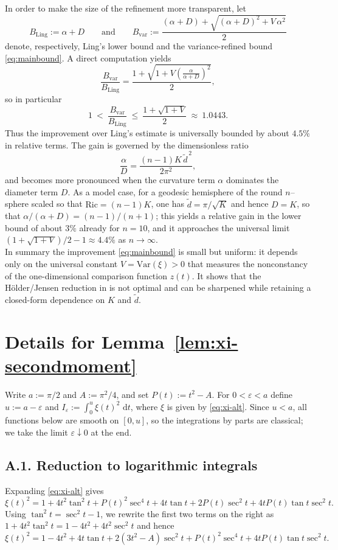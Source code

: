 \documentclass[11pt]{article}
\newcommand{\Ric}{\mathrm{Ric}}
\newcommand{\Var}{\mathrm{Var}}
\newcommand{\dd}{\,\mathrm{d}}
\newcommand{\de}{\tilde d}
\begin{document}
In order to make the size of the refinement more transparent, let
\[
B_{\mathrm{Ling}}:=\alpha+D
\qquad\text{and}\qquad
B_{\mathrm{var}}:=\frac{(\alpha+D)+\sqrt{(\alpha+D)^2+V\,\alpha^2}}{2}
\]
denote, respectively, Ling's lower bound and the variance-refined bound \eqref{eq:mainbound}.
A direct computation yields
\[
\frac{B_{\mathrm{var}}}{B_{\mathrm{Ling}}}
=
\frac{1+\sqrt{1+V\left(\frac{\alpha}{\alpha+D}\right)^2}}{2},
\]
so in particular
\[
1\ <\ \frac{B_{\mathrm{var}}}{B_{\mathrm{Ling}}}
\ \le\
\frac{1+\sqrt{1+V}}{2}
\ \approx\ 1.0443.
\]
Thus the improvement over Ling's estimate is universally bounded by about $4.5\%$ in relative terms.
The gain is governed by the dimensionless ratio
\[
\frac{\alpha}{D}=\frac{(n-1)K\,\de^{\,2}}{2\pi^2},
\]
and becomes more pronounced when the curvature term $\alpha$ dominates the diameter term $D$.
As a model case, for a geodesic hemisphere of the round $n$--sphere scaled so that $\Ric=(n-1)K$,
one has $\de=\pi/\sqrt{K}$ and hence $D=K$, so that $\alpha/(\alpha+D)=(n-1)/(n+1)$; this yields a
relative gain in the lower bound of about $3\%$ already for $n=10$, and it approaches the universal
limit $(1+\sqrt{1+V})/2-1\approx 4.4\%$ as $n\to\infty$.\\

In summary the improvement \eqref{eq:mainbound} is small but uniform: it depends only on the universal constant $V=\Var(\xi)>0$ that measures the nonconstancy of the one-dimensional comparison function $z(t)$.
It shows that the H\"older/Jensen reduction in \cite{Ling2006} is not optimal and can be sharpened while retaining a closed-form dependence on $K$ and $\de$.


\appendix

\section{Details for Lemma~\texorpdfstring{\ref{lem:xi-secondmoment}}{4.1}}
\label{app:lem4.1-details}

Write $a:=\pi/2$ and $A:=\pi^2/4$, and set $P(t):=t^2-A$.
For $0<\varepsilon<a$ define $u:=a-\varepsilon$ and
\(
I_{\varepsilon}:=\int_{0}^{u}\xi(t)^2\,\dd t
\),
where $\xi$ is given by \eqref{eq:xi-alt}.
Since $u<a$, all functions below are smooth on $[0,u]$, so the integrations by parts are classical; we take the limit $\varepsilon\downarrow 0$ at the end.

\subsection*{A.1. Reduction to logarithmic integrals}
Expanding \eqref{eq:xi-alt} gives
\begin{equation}
\label{eq:appendix-expand}
\xi(t)^2
=
1+4t^2\tan^2 t + P(t)^2\sec^4 t +4t\tan t +2P(t)\sec^2 t +4tP(t)\tan t\sec^2 t.
\end{equation}
Using $\tan^2 t=\sec^2 t-1$, we rewrite the first two terms on the right as
\(
1+4t^2\tan^2 t = 1-4t^2+4t^2\sec^2 t
\)
and hence
\begin{equation}
\label{eq:appendix-group}
\xi(t)^2
=
1-4t^2 + 4t\tan t + 2(3t^2-A)\sec^2 t + P(t)^2\sec^4 t + 4tP(t)\tan t\sec^2 t.
\end{equation}
\end{document}

